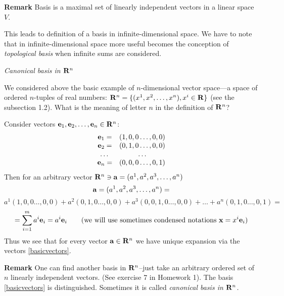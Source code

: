 \documentclass[12pt]{article}
\numberwithin{equation}{section}
\begin{document}
{\bf Remark} Basis is a maximal set of  linearly independent vectors
in a linear space $V$.

\m

{\footnotesize  This leads to definition of
a basis  in infinite-dimensional space. We have to note that in infinite-dimensional space more useful becomes the conception of {\it topological basis}
when infinite sums are considered.}



{\it Canonical basis  in ${\bf R}^n$}

\m

We considered above  the basic example of $n$-dimensional vector space---a space
of ordered $n$-tuples of real numbers: ${\bf R}^n=\{(x^1,x^2,\dots,x^n),  x^i\in {\bf R}\}$
(see the subsection 1.2).
What is the meaning of letter $n$ in the definition of ${\bf R}^n$?

Consider vectors ${\bf e}_1,{\bf e}_2,\dots,{\bf e}_n\in {\bf R}^n$:
                  \begin{equation}\label{basicvectors}
                  \begin{array}{cc}
                    {\bf e}_1=& (1,0,0\dots,0,0) \\
                    {\bf e}_2=& (0,1,0\dots,0,0) \\
                    \dots & \dots \\
                    {\bf e}_n=& (0,0,0\dots,0,1) \\
                  \end{array}
                  \end{equation}
Then for an arbitrary vector   ${\bf R}^n\ni {\bf a}=(a^1,a^2,a^3,\dots,a^n)$
                     $$
            {\bf a}=(a^1,a^2,a^3,\dots,a^n)=
                      $$
                      $$
                      a^1(1,0,0\dots,0,0)+a^2(0,1,0\dots,0,0)+
            a^3(0,0,1,0\dots,0,0)+\dots+a^n(0,1,0\dots,0,1)=
                         $$
                         $$
            =\sum_{i=1}^m a^i{\bf e}_i=a^i{\bf e}_i \qquad \hbox{(we will use sometimes condensed notations}\,\, {\bf x}= x^i{\bf e}_i)
                            $$
Thus we see that for every vector ${\bf a}\in {\bf R}^n$ we have unique expansion via the vectors
 \eqref{basicvectors}.

{\bf Remark} One can find
   another basis in ${\bf R}^n$--just take an arbitrary ordered set of $n$  linearly independent vectors.
   (See exercise 7 in Homework 1).
 The basis \eqref{basicvectors} is distinguished. Sometimes it is called {\it canonical basis in ${\bf R}^n$.}
\end{document}
